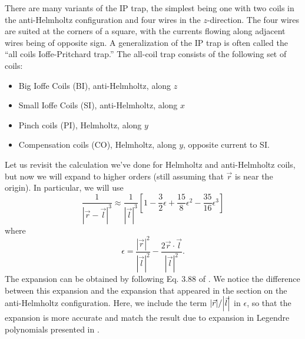 \documentclass{book}
\theoremstyle{definition}
\newcommand{\f}[2]{\frac{#1}{#2}}
\newcommand{\lb}{\left[}
\newcommand{\rb}{\right]}
\begin{document}
There are many variants of the IP trap, the simplest being one with two coils in the anti-Helmholtz configuration and four wires in the $z$-direction. The four wires are suited at the corners of a square, with the currents flowing along adjacent wires being of opposite sign. A generalization of the IP trap is often called the ``all coils Ioffe-Pritchard trap.'' The all-coil trap consists of the following set of coils:
\begin{itemize}
	\item Big Ioffe Coils (BI), anti-Helmholtz, along $z$
	\item Small Ioffe Coils (SI), anti-Helmholtz, along $x$
	\item Pinch coils (PI), Helmholtz, along $y$
	\item Compensation coils (CO), Helmholtz, along $y$, opposite current to SI.
\end{itemize}

Let us revisit the calculation we've done for Helmholtz and anti-Helmholtz coils, but now we will expand to higher orders (still assuming that $\vec{r}$ is near the origin). In particular, we will use
\begin{equation*}
\f{1}{|\vec{r} - \vec{l}|^3} \approx \f{1}{|\vec{l}|^3} 
\lb 1 -\f{3}{2}\epsilon
+ \f{15}{8}\epsilon^2 
- \f{35}{16}\epsilon^3 \rb
\end{equation*}
where
\begin{equation*}
\epsilon = \f{|\vec{r}|^2}{|\vec{l}|^2} - \f{2\vec{r}\cdot\vec{l}}{|\vec{l}|^2}.
\end{equation*}
The expansion can be obtained by following 
Eq. 3.88 of \cite{griffiths2005introduction}. We notice the difference between this expansion and the expansion that appeared in the section on the anti-Helmholtz configuration. Here, we include the term $\abs{\vec{r}}/\abs{\vec{l}}$ in $\epsilon$, so that the expansion is more accurate and match the result due to expansion in Legendre polynomials presented in \cite{allcoil}.\\
\end{document}
